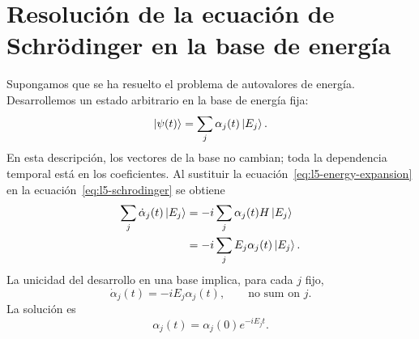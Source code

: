 \begin{classroomqa}\end{classroomqa}

\begin{classroomqa}\end{classroomqa}

\section{Resolución de la ecuación de Schr\"odinger en la base de energía}

Supongamos que se ha resuelto el problema de autovalores de energía. Desarrollemos un estado arbitrario en la base de energía fija:
\begin{equation}
\left\lvert\psi(t)\right\rangle=\sum_j\alpha_j(t)\left\lvert E_j\right\rangle.
\label{eq:l5-energy-expansion}
\end{equation}
En esta descripción, los vectores de la base no cambian; toda la dependencia temporal está en los coeficientes. Al sustituir la ecuación~\eqref{eq:l5-energy-expansion} en la ecuación~\eqref{eq:l5-schrodinger} se obtiene
\begin{align}
\sum_j\dot\alpha_j(t)\left\lvert E_j\right\rangle
&=-i\sum_j\alpha_j(t)H\left\lvert E_j\right\rangle\\
&=-i\sum_j E_j\alpha_j(t)\left\lvert E_j\right\rangle.
\end{align}
La unicidad del desarrollo en una base implica, para cada \(j\) fijo,
\begin{equation}
\dot\alpha_j(t)=-iE_j\alpha_j(t),
\qquad\text{no sum on \(j\)}.
\end{equation}
La solución es
\begin{equation}
\alpha_j(t)=\alpha_j(0)e^{-iE_jt}.
\label{eq:l5-energy-phase}
\end{equation}

